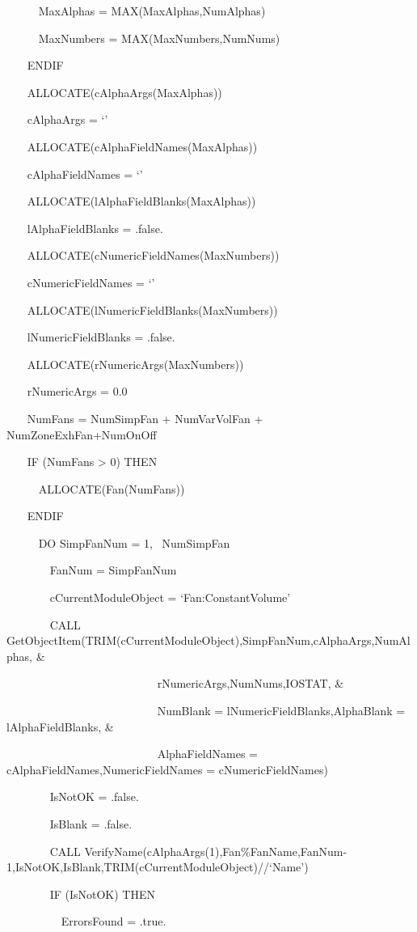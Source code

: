 ~~~~~ MaxAlphas = MAX(MaxAlphas,NumAlphas)

~~~~~ MaxNumbers = MAX(MaxNumbers,NumNums)

~~~ ENDIF

~~~ ALLOCATE(cAlphaArgs(MaxAlphas))

~~~ cAlphaArgs = `'

~~~ ALLOCATE(cAlphaFieldNames(MaxAlphas))

~~~ cAlphaFieldNames = `'

~~~ ALLOCATE(lAlphaFieldBlanks(MaxAlphas))

~~~ lAlphaFieldBlanks = .false.

~~~ ALLOCATE(cNumericFieldNames(MaxNumbers))

~~~ cNumericFieldNames = `'

~~~ ALLOCATE(lNumericFieldBlanks(MaxNumbers))

~~~ lNumericFieldBlanks = .false.

~~~ ALLOCATE(rNumericArgs(MaxNumbers))

~~~ rNumericArgs = 0.0

~~~ NumFans = NumSimpFan + NumVarVolFan + NumZoneExhFan+NumOnOff

~~~ IF (NumFans \textgreater{} 0) THEN

~~~~~ ALLOCATE(Fan(NumFans))

~~~ ENDIF

~~~~~ DO SimpFanNum = 1,~ NumSimpFan

~~~~~~~ FanNum = SimpFanNum

~~~~~~~ cCurrentModuleObject = `Fan:ConstantVolume'

~~~~~~~ CALL GetObjectItem(TRIM(cCurrentModuleObject),SimpFanNum,cAlphaArgs,NumAlphas, \&

~~~~~~~~~~~~~~~~~~~~~~~~~~ rNumericArgs,NumNums,IOSTAT, \&

~~~~~~~~~~~~~~~~~~~~~~~~~~ NumBlank = lNumericFieldBlanks,AlphaBlank = lAlphaFieldBlanks, \&

~~~~~~~~~~~~~~~~~~~~~~~~~~ AlphaFieldNames = cAlphaFieldNames,NumericFieldNames = cNumericFieldNames)

~~~~~~~ IsNotOK = .false.

~~~~~~~ IsBlank = .false.

~~~~~~~ CALL VerifyName(cAlphaArgs(1),Fan\%FanName,FanNum-1,IsNotOK,IsBlank,TRIM(cCurrentModuleObject)//`Name')

~~~~~~~ IF (IsNotOK) THEN

~~~~~~~~~ ErrorsFound = .true.

